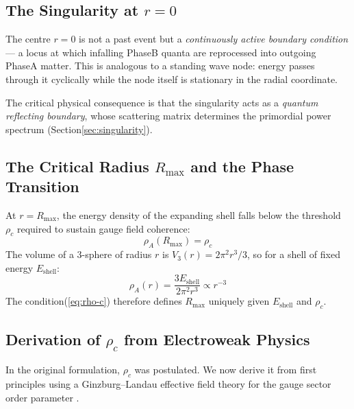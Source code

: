 \documentclass[10pt,twocolumn]{article}
\theoremstyle{definition}
\newcommand{\Rmax}{R_{\max}}
\newcommand{\rhoA}{\rho_{A}}
\newcommand{\rhoc}{\rho_{c}}
\begin{document}
\subsection{The Singularity at \( r=0 \)}
\label{sec:singularity-topology}

The centre \( r=0 \) is not a past event but a
\emph{continuously active boundary condition} --- a locus
at which infalling Phase\nobreakspace{}B quanta are reprocessed into
outgoing Phase\nobreakspace{}A matter.  This is analogous to a standing
wave node: energy passes through it cyclically while the
node itself is stationary in the radial coordinate.

The critical physical consequence is that the singularity
acts as a \emph{quantum reflecting boundary}, whose
scattering matrix determines the primordial power spectrum
(Section\nobreakspace{}\ref{sec:singularity}).

\subsection{The Critical Radius \( \Rmax \) and the
            Phase Transition}
\label{sec:rmax}

At \( r=\Rmax \), the energy density of the expanding shell
falls below the threshold \( \rhoc \) required to sustain
gauge field coherence:
\begin{equation}
  \rhoA(\Rmax) = \rhoc
  \label{eq:rho-c,eq:Rmax-derived}
\end{equation}
The volume of a 3-sphere of radius \( r \) is
\( V_{3}(r)=2\pi^{2}r^{3}/3 \), so for a shell of fixed
energy \( E_{\mathrm{shell}} \):
\begin{equation}
  \rhoA(r) = \frac{3E_{\mathrm{shell}}}{2\pi^{2}r^{3}}
  \propto r^{-3}
\end{equation}
The condition\nobreakspace{}(\ref{eq:rho-c}) therefore defines
\( \Rmax \) uniquely given \( E_{\mathrm{shell}} \) and \( \rhoc \).

\subsection{Derivation of \( \rhoc \) from Electroweak
            Physics}
\label{sec:rhoc-derivation}

In the original formulation, \( \rhoc \) was postulated.
We now derive it from first principles using a
Ginzburg--Landau effective field theory for the gauge
sector order parameter \citep{Ginzburg1950,LandauSM,Higgs1964}.
\end{document}
